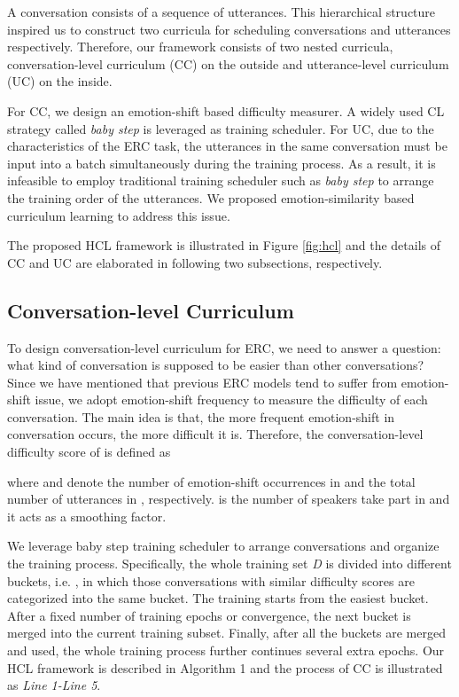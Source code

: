 \documentclass[letterpaper]{article} \usepackage{aaai22}  \usepackage{times}  \usepackage{helvet}  \usepackage{courier}  \usepackage[hyphens]{url}  \usepackage{graphicx} \urlstyle{rm} \def\UrlFont{\rm}  \usepackage{natbib}  \usepackage{caption} \DeclareCaptionStyle{ruled}{labelfont=normalfont,labelsep=colon,strut=off} \frenchspacing  \setlength{\pdfpagewidth}{8.5in}  \setlength{\pdfpageheight}{11in}
\begin{document}
A conversation consists of a sequence of utterances. This hierarchical structure inspired us to construct two curricula for scheduling conversations and utterances respectively. Therefore, our framework consists of two nested curricula, conversation-level curriculum (CC) on the outside and utterance-level curriculum (UC) on the inside.

For CC, we  design an emotion-shift based difficulty measurer. A widely used CL strategy called \emph{baby step} \cite{spitkovsky2010baby}  is leveraged as training scheduler. 
For UC, due to the characteristics of the ERC task, the utterances in the same conversation must be input into a batch simultaneously during the training process. As a result, it is infeasible to employ traditional training scheduler such as \emph{baby step} to arrange the training order of the  utterances. We proposed emotion-similarity based curriculum learning to address this issue.

The proposed HCL framework is illustrated in Figure  \ref{fig:hcl} and the details of CC and UC are elaborated in following two subsections, respectively.

\subsection{Conversation-level Curriculum }

To design conversation-level curriculum for ERC, we need to answer a question: what kind of conversation is supposed to be easier than other conversations?
Since we have mentioned that previous ERC models  \cite{majumder2019dialoguernn,shen2021dialogxl} tend to suffer from emotion-shift issue, we adopt emotion-shift frequency to measure the difficulty of each conversation. The main idea is that, the more frequent emotion-shift in conversation  occurs, the more difficult it is. Therefore, the conversation-level difficulty score of  is defined as



where  and  denote the number of emotion-shift occurrences in  and the total number of utterances in , respectively.  is the number of speakers take part in  and it acts as a smoothing factor. 


We leverage baby step training scheduler  \cite{spitkovsky2010baby}  to arrange conversations and organize the training process. Specifically, the whole training set \emph{D} is divided into different buckets, i.e. , in which those conversations with similar difficulty scores are categorized into the same bucket. The training starts from the easiest bucket. After a fixed number of training epochs or convergence, the next bucket is merged into the current training subset. Finally, after all the buckets are merged and used, the whole training process further continues several extra epochs. Our HCL framework is described in Algorithm 1 and the process of CC is illustrated as \emph{Line 1-Line 5}. 
\end{document}
